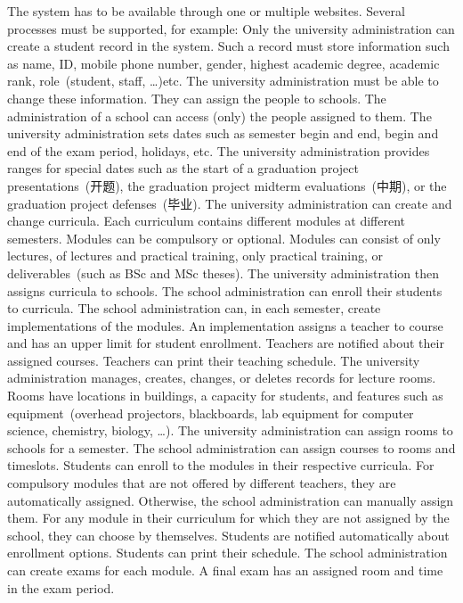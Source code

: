 The system has to be available through one or multiple websites.
Several processes must be supported, for example:%
%
%
Only the university administration can create a student record in the system.
Such a record must store information such as name, ID, mobile phone number, gender, highest academic degree, academic rank, role~(student, staff, \dots)etc.
The university administration must be able to change these information.
They can assign the people to schools.
The administration of a school can access (only) the people assigned to them.%
\endhsection%
%
%
The university administration sets dates such as semester begin and end, begin and end of the exam period, holidays, etc.
The university administration provides ranges for special dates such as the start of a graduation project presentations~(开题), the graduation project midterm evaluations~(中期), or the graduation project defenses~(毕业).
\endhsection%
%
%
The university administration can create and change curricula.
Each curriculum contains different modules at different semesters.
Modules can be compulsory or optional.
Modules can consist of only lectures, of lectures and practical training, only practical training, or deliverables~(such as BSc and MSc theses).
The university administration then assigns curricula to schools.
The school administration can enroll their students to curricula.%
\endhsection%
%
%
The school administration can, in each semester, create implementations of the modules.
An implementation assigns a teacher to course and has an upper limit for student enrollment.
Teachers are notified about their assigned courses.
Teachers can print their teaching schedule.%
\endhsection%
%
%
The university administration manages, creates, changes, or deletes records for lecture rooms.
Rooms have locations in buildings, a capacity for students, and features such as equipment~(overhead projectors, blackboards, lab equipment for computer science, chemistry, biology, \dots).
The university administration can assign rooms to schools for a semester.
The school administration can assign courses to rooms and timeslots.%
\endhsection%
%
%
Students can enroll to the modules in their respective curricula.
For compulsory modules that are not offered by different teachers, they are automatically assigned.
Otherwise, the school administration can manually assign them.
For any module in their curriculum for which they are not assigned by the school, they can choose by themselves.
Students are notified automatically about enrollment options.
Students can print their schedule.%
\endhsection%
%
%
The school administration can create exams for each module.
A final exam has an assigned room and time in the exam period.

